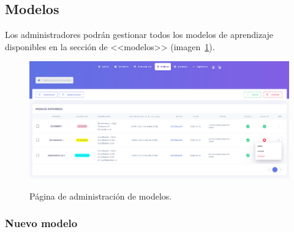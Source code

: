 \subsection{Modelos}
\label{s-e:models}

Los administradores podrán gestionar todos los modelos de aprendizaje disponibles en la sección de <<modelos>> (imagen~\ref{e-5:models}).

\begin{figure}[h]
	\caption[Manual de usuario: página de modelos]{Página de administración de modelos.}
	\centering
	\includegraphics[width=\textwidth]{../img/anexos/user_guide/5_models}
	\label{e-5:models}
\end{figure}

\subsubsection{Nuevo modelo}
\label{s-e:nuevo-modelo}

